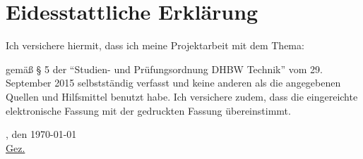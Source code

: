 \chapter*{Eidesstattliche Erklärung}
Ich versichere hiermit, dass ich meine Projektarbeit mit dem Thema:
\begin{quote}
	\textit{\titel}
\end{quote} 
gemäß § 5 der \enquote{Studien- und Prüfungsordnung DHBW Technik} vom 29. September 2015 selbstständig verfasst und keine anderen als die angegebenen Quellen und Hilfsmittel benutzt habe. Ich versichere zudem, dass die eingereichte elektronische Fassung mit der gedruckten Fassung übereinstimmt.

\vspace{1cm}

\verfassungsort, den \today \\[0.5cm]
	{\underline{Gez. \autor}}
	{\makebox[6cm]{\hrulefill}}\\ 
\autorReverse
